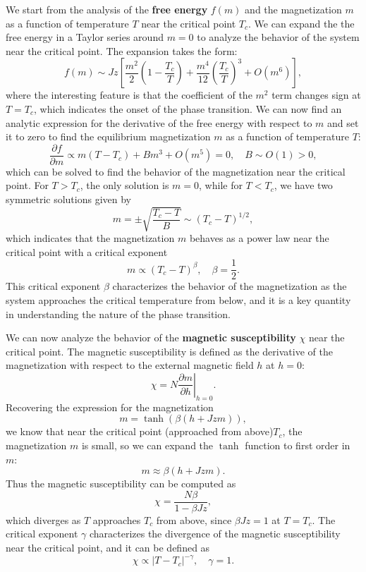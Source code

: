 We start from the analysis of the \textbf{free energy} \(f(m)\) and the magnetization \(m\) as a function of temperature \(T\) near the critical point \(T_c\). We can expand the the free energy in a Taylor series around \(m = 0\) to analyze the behavior of the system near the critical point. The expansion takes the form:
\[
    f(m) \sim Jz \left[ \frac{m^2}{2}\left(1-\frac{T_c}{T}\right) + \frac{m^4}{12} \left(\frac{T_c}{T}\right)^3 + O(m^6) \right],
\]
where the interesting feature is that the coefficient of the \(m^2\) term changes sign at \(T = T_c\), which indicates the onset of the phase transition. We can now find an analytic expression for the derivative of the free energy with respect to \(m\) and set it to zero to find the equilibrium magnetization \(m\) as a function of temperature \(T\):
\[
    \frac{\partial f}{\partial m} \propto m(T - T_c) + B m^3 + O(m^5) = 0, \quad B \sim O(1) > 0,
\]
which can be solved to find the behavior of the magnetization near the critical point. For \(T > T_c\), the only solution is \(m = 0\), while for \(T < T_c\), we have two symmetric solutions given by
\[
    m = \pm \sqrt{\frac{T_c - T}{B}} \sim (T_c - T)^{1/2},
\]
which indicates that the magnetization \(m\) behaves as a power law near the critical point with a critical exponent
\[
    m \propto (T_c - T)^{\beta}, \quad \beta = \frac{1}{2}.
\]
This critical exponent \(\beta\) characterizes the behavior of the magnetization as the system approaches the critical temperature from below, and it is a key quantity in understanding the nature of the phase transition.

We can now analyze the behavior of the \textbf{magnetic susceptibility} \(\chi\) near the critical point. The magnetic susceptibility is defined as the derivative of the magnetization with respect to the external magnetic field \(h\) at \(h = 0\):
\[
    \chi = \left. N\frac{\partial m}{\partial h} \right|_{h=0}.
\]
Recovering the expression for the magnetization
\[
    m = \tanh\left( \beta (h + J z m) \right),
\]
we know that near the critical point (approached from above)\(T_c\), the magnetization \(m\) is small, so we can expand the \(\tanh\) function to first order in \(m\):
\[
    m \approx \beta (h + J z m).
\]
Thus the magnetic susceptibility can be computed as
\[
    \chi = \frac{N \beta}{1 - \beta J z},
\]
which diverges as \(T\) approaches \(T_c\) from above, since \(\beta J z = 1\) at \(T = T_c\). The critical exponent \(\gamma\) characterizes the divergence of the magnetic susceptibility near the critical point, and it can be defined as
\[
    \chi \propto |T - T_c|^{-\gamma}, \quad \gamma = 1.
\]

